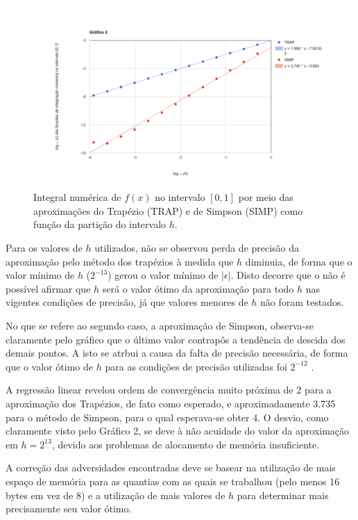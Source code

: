 \documentclass{article}
\begin{document}
\begin{figure}[h!]
  \centering
  \includegraphics[width=\textwidth]{graf2}
  \caption{Integral numérica de $f(x)$ no intervalo $[0, 1]$ por meio das aproximações do Trapézio (TRAP) e de Simpson (SIMP) como função da partição do intervalo $h$.}
  \label{fig:2}
\end{figure}

Para os valores de $h$ utilizados, não se observou perda de precisão da aproximação pelo método dos trapézios à medida que $h$ diminuia, de forma que o valor mínimo de $h$ ($2^{-13}$) gerou o valor mínimo de $|\epsilon|$. Disto decorre que o não é possível afirmar que $h$ será o valor ótimo da aproximação para todo $h$ nas vigentes condições de precisão, já que valores menores de $h$ não foram testados.\par

No que se refere ao segundo caso, a aproximação de Simpson, observa-se claramente pelo gráfico que o último valor contrapôs a tendência de descida dos demais pontos. A isto se atrbui a causa da falta de precisão necessária, de forma que o valor ótimo de $h$ para as condições de precisão utilizadas foi $2^{-12}$ .\par

A regressão linear revelou ordem de convergência muito próxima de 2 para a aproximação dos Trapézios, de fato como esperado, e aproximadamente 3.735 para o método de Simpson, para o qual esperava-se obter 4.
O desvio, como claramente visto pelo Gráfico 2, se deve à não acuidade do valor da aproximação em $h = 2^{13}$, devido aos problemas de alocamento de memória insuficiente.\par
A correção das adversidades encontradas deve se basear na utilização de mais espaço de memória para as quantias com as quais se trabalhou (pelo menos 16 bytes em vez de 8) e a utilização de mais valores de $h$ para determinar mais precisamente seu valor ótimo.
\end{document}
